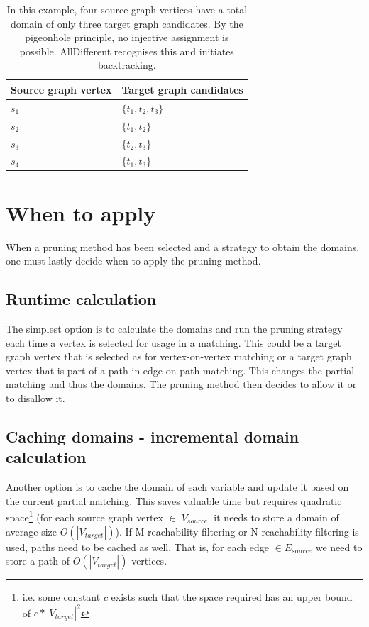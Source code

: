 \begin{table}
\centering
\begin{tabular}{|l|l|}
\hline
\textbf{Source graph vertex} & \textbf{Target graph candidates} \\ \hline
$s_1$                          & $\{t_1, t_2, t_3\}$      \\ \hline
$s_2$                          & $\{t_1, t_2\}$              \\ \hline
$s_3$                          & $\{t_2, t_3\}$              \\ \hline
$s_4$                          & $\{t_1, t_3\}$             \\ \hline
\end{tabular}
\caption{In this example, four source graph vertices have a total domain of only three target graph candidates. By the pigeonhole principle, no injective assignment is possible. AllDifferent recognises this and initiates backtracking.}
\label{tab:alldifferent}
\end{table}




\section{When to apply}
When a pruning method has been selected and a strategy to obtain the domains, one must lastly decide when to apply the pruning method.
\subsection{Runtime calculation}
The simplest option is to calculate the domains and run the pruning strategy each time a vertex is selected for usage in a matching. This could be a target graph vertex that is selected as for vertex-on-vertex matching or a target graph vertex that is part of a path in edge-on-path matching. This changes the partial matching and thus the domains. The pruning method then decides to allow it or to disallow it.
\subsection{Caching domains - incremental domain calculation}
Another option is to cache the domain of each variable and update it based on the current partial matching. This saves valuable time but requires quadratic space\footnote{i.e. some constant $c$ exists such that the space required has an upper bound of $c * |V_{target}|^2$} (for each source graph vertex $\in |V_{source}|$ it needs to store a domain of average size $O(|V_{target}|)$). If M-reachability filtering or N-reachability filtering is used, paths need to be cached as well. That is, for each edge $\in E_{source}$ we need to store a path of $O(|V_{target}|)$ vertices.
